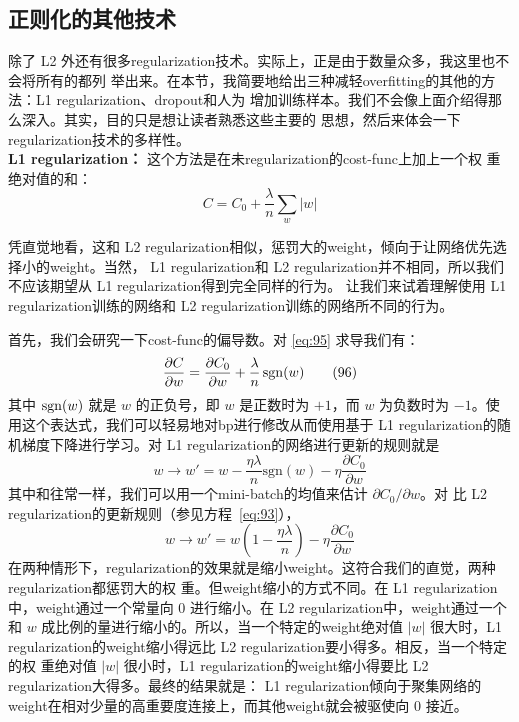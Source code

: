 \subsection{正则化的其他技术}

除了 L2 外还有很多\gls*{regularization}技术。实际上，正是由于数量众多，我这里也不会将所有的都列
举出来。在本节，我简要地给出三种减轻\gls*{overfitting}的其他的方法：L1 \gls*{regularization}、\gls*{dropout}和人为
增加训练样本。我们不会像上面介绍得那么深入。其实，目的只是想让读者熟悉这些主要的
思想，然后来体会一下\gls*{regularization}技术的多样性。\\

\textbf{L1 \gls*{regularization}：} 这个方法是在未\gls*{regularization}的\gls*{cost-func}上加上一个权
重绝对值的和：
\begin{equation}
  C = C_0 + \frac{\lambda}{n} \sum_w |w|
  \label{eq:95}\tag{95}
\end{equation}

凭直觉地看，这和 L2 \gls*{regularization}相似，惩罚大的\gls*{weight}，倾向于让网络优先选择小的\gls*{weight}。当然，
L1 \gls*{regularization}和 L2 \gls*{regularization}并不相同，所以我们不应该期望从 L1 \gls*{regularization}得到完全同样的行为。
让我们来试着理解使用 L1 \gls*{regularization}训练的网络和 L2 \gls*{regularization}训练的网络所不同的行为。

首先，我们会研究一下\gls*{cost-func}的偏导数。对 \eqref{eq:95} 求导我们有：
\begin{equation}
  \frac{\partial C}{\partial w} = \frac{\partial C_0}{\partial w}
  + \frac{\lambda}{n} \, {\rm sgn}(w)
  \label{eq:96}\tag{96}
\end{equation}
其中 ${\rm sgn}(w)$ 就是 $w$ 的正负号，即 $w$ 是正数时为 $+1$，而 $w$ 为负数时为
$-1$。使用这个表达式，我们可以轻易地对\gls*{bp}进行修改从而使用基于 L1 \gls*{regularization}的随
机梯度下降进行学习。对 L1 \gls*{regularization}的网络进行更新的规则就是
\begin{equation}
  w \rightarrow w' = w-\frac{\eta \lambda}{n} \mbox{sgn}(w) - \eta \frac{\partial
  C_0}{\partial w}
  \label{eq:97}\tag{97}
\end{equation}
其中和往常一样，我们可以用一个\gls*{mini-batch}的均值来估计 $\partial C_0/\partial w$。对
比 L2 \gls*{regularization}的更新规则（参见方程~\eqref{eq:93}），
\begin{equation}
  w \rightarrow w' = w\left(1 - \frac{\eta \lambda}{n} \right)
  - \eta \frac{\partial C_0}{\partial w}
  \label{eq:98}\tag{98}
\end{equation}
在两种情形下，\gls*{regularization}的效果就是缩小\gls*{weight}。这符合我们的直觉，两种\gls*{regularization}都惩罚大的权
重。但\gls*{weight}缩小的方式不同。在 L1 \gls*{regularization}中，\gls*{weight}通过一个常量向 $0$ 进行缩小。在 L2
\gls*{regularization}中，\gls*{weight}通过一个和 $w$ 成比例的量进行缩小的。所以，当一个特定的\gls*{weight}绝对值
$|w|$ 很大时，L1 \gls*{regularization}的\gls*{weight}缩小得远比 L2 \gls*{regularization}要小得多。相反，当一个特定的权
重绝对值 $|w|$ 很小时，L1 \gls*{regularization}的\gls*{weight}缩小得要比 L2 \gls*{regularization}大得多。最终的结果就是：
L1 \gls*{regularization}倾向于聚集网络的\gls*{weight}在相对少量的高重要度连接上，而其他\gls*{weight}就会被驱使向
$0$ 接近。

